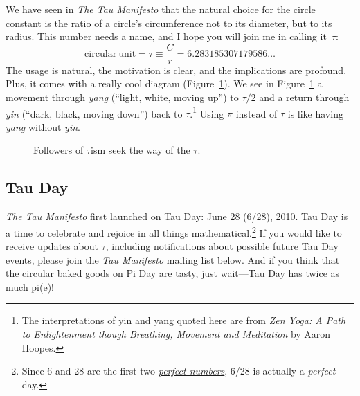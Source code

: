 We have seen in \emph{The Tau Manifesto} that the natural choice for the circle constant is the ratio of a circle's circumference not to its diameter, but to its radius. This number needs a name, and I hope you will join me in calling it~$\tau$:
\[
  \mathrm{circular\ unit} = \tau \equiv \frac{C}{r} = 6.283185307179586\ldots
\]
The usage is natural, the motivation is clear, and the implications are profound. Plus, it comes with a really cool diagram (Figure~\ref{fig:tauism}). We see in Figure~\ref{fig:tauism} a movement through \emph{yang} (``light, white, moving up'') to $\tau/2$ and a return through \emph{yin} (``dark, black, moving down'') back to $\tau$.\footnote{The interpretations of yin and yang quoted here are from \emph{Zen Yoga: A Path to Enlightenment though Breathing, Movement and Meditation} by Aaron Hoopes.} Using $\pi$ instead of $\tau$ is like having \emph{yang} without \emph{yin}.

\begin{figure}
\begin{center}
\end{center}
\caption{Followers of $\tau$ism seek the way of the $\tau$.\label{fig:tauism}}
\end{figure}



  \subsection{Tau Day} %
  \label{sec:tau_day}

\emph{The Tau Manifesto} first launched on Tau Day: June 28 (6/28), 2010. Tau Day is a time to celebrate and rejoice in all things mathematical.\footnote{Since 6 and 28 are the first two \href{http://en.wikipedia.org/wiki/Perfect_number}{\emph{perfect numbers}}, 6/28 is actually a \emph{perfect} day.} If you would like to receive updates about $\tau$, including notifications about possible future Tau Day events, please join the \emph{Tau Manifesto} mailing list below. And if you think that the circular baked goods on Pi Day are tasty, just wait---Tau Day has twice as much pi(e)!

